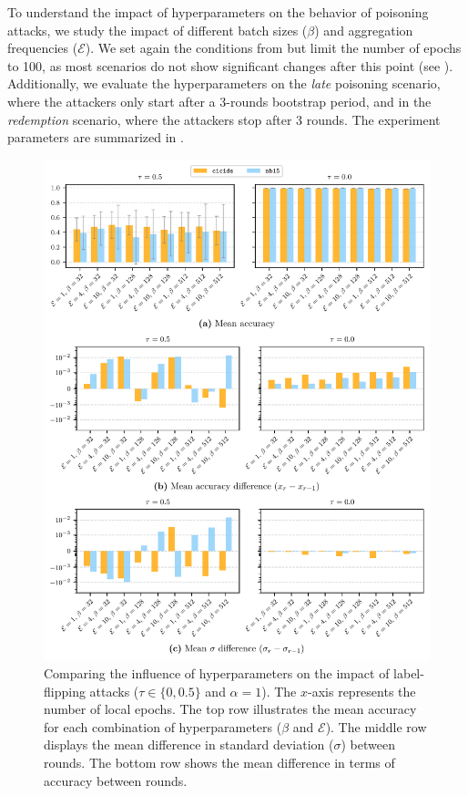 To understand the impact of hyperparameters on the behavior of poisoning attacks, we study the impact of different batch sizes ($\beta$) and aggregation frequencies ($\mathcal{E}$).
We set again the conditions from  but limit the number of epochs to 100, as most scenarios do not show significant changes after this point (see ).
Additionally, we evaluate the hyperparameters on the \emph{late} poisoning scenario, where the attackers only start after a 3-rounds bootstrap period, and in the \emph{redemption} scenario, where the attackers stop after 3 rounds.
The experiment parameters are summarized in .

\begin{figure}
  \centering
  \includegraphics[width=\linewidth]{figures/hyperparams-continous.pdf}
  \caption[
    Comparing the influence of hyperparameters on the impact of label-flipping attacks.
  ]{
    Comparing the influence of hyperparameters on the impact of label-flipping attacks ($\tau \in \lbrace 0, 0.5 \rbrace$ and $\alpha=1$).
    The $x$-axis represents the number of local epochs.
    The top row illustrates the mean accuracy for each combination of hyperparameters ($\beta$ and $\mathcal{E}$).
    The middle row displays the mean difference in standard deviation ($\sigma$) between rounds.
    The bottom row shows the mean difference in terms of accuracy between rounds.
    \label{fig:assess.hyperparams-continuous}
  }
\end{figure}

